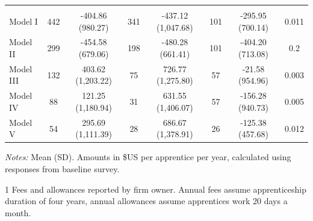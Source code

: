 \documentclass[
  a4paper, twoside, 12pt]{book}
\begin{document}
\begin{table}[H]
{\begin{threeparttable}
\begin{tabular}[t]{lccccccc}
\addlinespace[0.3em]
\multicolumn{8}{l}{\textbf{Net Benefits}}\\
\hspace{1em}Model I & 442 & -404.86 (980.27) & 341 & -437.12 (1,047.68) & 101 & -295.95 (700.14) & 0.011\\
\hspace{1em}Model II & 299 & -454.58 (679.06) & 198 & -480.28 (661.41) & 101 & -404.20 (713.08) & 0.2\\
\hspace{1em}Model III & 132 & 403.62 (1,203.22) & 75 & 726.77 (1,275.80) & 57 & -21.58 (954.96) & 0.003\\
\hspace{1em}Model IV & 88 & 121.25 (1,180.94) & 31 & 631.55 (1,406.07) & 57 & -156.28 (940.73) & 0.005\\
\hspace{1em}Model V & 54 & 295.69 (1,111.39) & 28 & 686.67 (1,378.91) & 26 & -125.38 (457.68) & 0.012\\
\bottomrule
\end{tabular}
\begin{tablenotes}
\small
\item \textit{Notes:} Mean (SD). Amounts in \$US per apprentice per year, calculated using responses from baseline survey.
\item[1] Fees and allowances reported by firm owner. Annual fees assume apprenticeship duration of four years, annual allowances assume apprentices work 20 days a month.
\end{tablenotes}
\end{threeparttable}}
\end{table}
\end{document}

